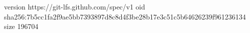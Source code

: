 version https://git-lfs.github.com/spec/v1
oid sha256:7b5cc1fa2f9ae5bb7393897d8c8d4f3be28b17e3c51c5b64626239f961236134
size 196704
